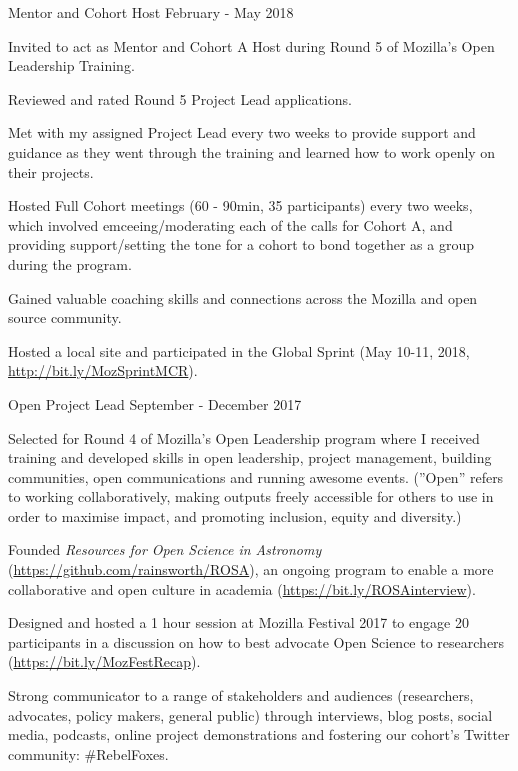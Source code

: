 \begin{cventries}
{\begin{cvitems}
      \end{cvitems}
    }
\cventry
    {Mentor and Cohort Host}
    {}
    {}
    {February - May 2018}
    {
      \begin{cvitems}
        \item{Invited to act as Mentor and Cohort A Host during Round 5 of Mozilla's Open Leadership Training.}
        \item{Reviewed and rated Round 5 Project Lead applications.}
        \item{Met with my assigned Project Lead every two weeks to provide support and guidance as they went through the training and learned how to work openly on their projects.}
        \item{Hosted Full Cohort meetings (60 - 90min, 35 participants) every two weeks, which involved emceeing/moderating each of the calls for Cohort A, and providing support/setting the tone for a cohort to bond together as a group during the program.}
        \item{Gained valuable coaching skills and connections across the Mozilla and open source community.}
        \item{Hosted a local site and participated in the Global Sprint (May 10-11, 2018, \url{http://bit.ly/MozSprintMCR}).}
      \end{cvitems}
    }
\cventry
    {Open Project Lead}
    {}
    {}
    {September - December 2017}
    {
      \begin{cvitems}
        \item{Selected for Round 4 of Mozilla's Open Leadership program where I received training and developed skills in open leadership, project management, building communities, open communications and running awesome events. (''Open'' refers to working collaboratively, making outputs freely accessible for others to use in order to maximise impact, and promoting inclusion, equity and diversity.)}
        \item{Founded \textit{Resources for Open Science in Astronomy} (\url{https://github.com/rainsworth/ROSA}), an ongoing program to enable a more collaborative and open culture in academia (\url{https://bit.ly/ROSAinterview}).}
        \item {Designed and hosted a 1 hour session at Mozilla Festival 2017 to engage 20 participants in a discussion on how to best advocate Open Science to researchers (\url{https://bit.ly/MozFestRecap}).}
        \item {Strong communicator to a range of stakeholders and audiences (researchers, advocates, policy makers, general public) through interviews, blog posts, social media, podcasts, online project demonstrations and fostering our cohort's Twitter community: \#RebelFoxes.}

\end{cvitems}}
\end{cventries}
